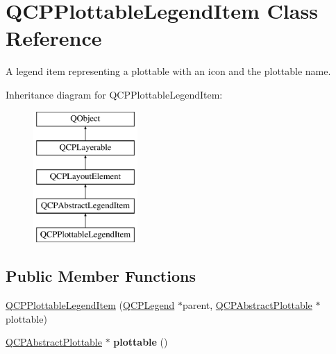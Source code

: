 \hypertarget{class_q_c_p_plottable_legend_item}{}\section{Q\+C\+P\+Plottable\+Legend\+Item Class Reference}
\label{class_q_c_p_plottable_legend_item}


A legend item representing a plottable with an icon and the plottable name.  


Inheritance diagram for Q\+C\+P\+Plottable\+Legend\+Item\+:\begin{figure}[H]
\begin{center}
\leavevmode
\includegraphics[height=5.000000cm]{class_q_c_p_plottable_legend_item}
\end{center}
\end{figure}
\subsection*{Public Member Functions}
\begin{DoxyCompactItemize}
\item 
\mbox{\hyperlink{class_q_c_p_plottable_legend_item_ac1072591fe409d3dabad51b23ee4d6c5}{Q\+C\+P\+Plottable\+Legend\+Item}} (\mbox{\hyperlink{class_q_c_p_legend}{Q\+C\+P\+Legend}} $\ast$parent, \mbox{\hyperlink{class_q_c_p_abstract_plottable}{Q\+C\+P\+Abstract\+Plottable}} $\ast$plottable)
\item 
\mbox{\label{class_q_c_p_plottable_legend_item_af29e9a2c60b4cba0cac2447b8af7b488}} 
\mbox{\hyperlink{class_q_c_p_abstract_plottable}{Q\+C\+P\+Abstract\+Plottable}} $\ast$ {\bfseries plottable} ()
\end{DoxyCompactItemize}
